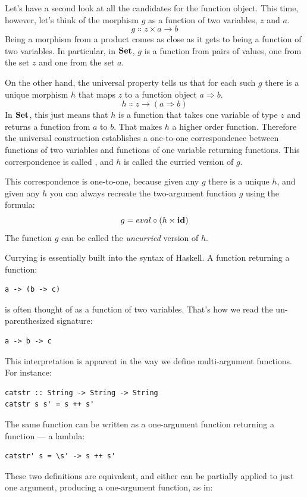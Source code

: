 Let's have a second look at all the candidates for the function object.
This time, however, let's think of the morphism $g$ as a function
of two variables, $z$ and $a$.
\[g \Colon z \times a \to b\]
Being a morphism from a product comes as close as it gets to being a
function of two variables. In particular, in $\mathbf{Set}$, $g$ is
a function from pairs of values, one from the set $z$ and one
from the set $a$.

On the other hand, the universal property tells us that for each such
$g$ there is a unique morphism $h$ that maps $z$ to
a function object $a{\Rightarrow} b$.
\[h \Colon z \to (a \Rightarrow b)\]
In $\mathbf{Set}$, this just means that $h$ is a function that
takes one variable of type $z$ and returns a function from
$a$ to $b$. That makes $h$ a higher order function.
Therefore the universal construction establishes a one-to-one
correspondence between functions of two variables and functions of one
variable returning functions. This correspondence is called
, and $h$ is called the curried version of $g$.

This correspondence is one-to-one, because given any $g$ there is
a unique $h$, and given any $h$ you can always recreate
the two-argument function $g$ using the formula:
\[g = eval \circ (h \times \mathbf{id})\]
The function $g$ can be called the \emph{uncurried} version of $h$.

Currying is essentially built into the syntax of Haskell. A function
returning a function:

\begin{Verbatim}
a -> (b -> c)
\end{Verbatim}
is often thought of as a function of two variables. That's how we read
the un-parenthesized signature:

\begin{Verbatim}
a -> b -> c
\end{Verbatim}
This interpretation is apparent in the way we define multi-argument
functions. For instance:

\begin{Verbatim}
catstr :: String -> String -> String
catstr s s' = s ++ s'
\end{Verbatim}
The same function can be written as a one-argument function returning a
function --- a lambda:

\begin{Verbatim}
catstr' s = \s' -> s ++ s'
\end{Verbatim}
These two definitions are equivalent, and either can be partially
applied to just one argument, producing a one-argument function, as in:


